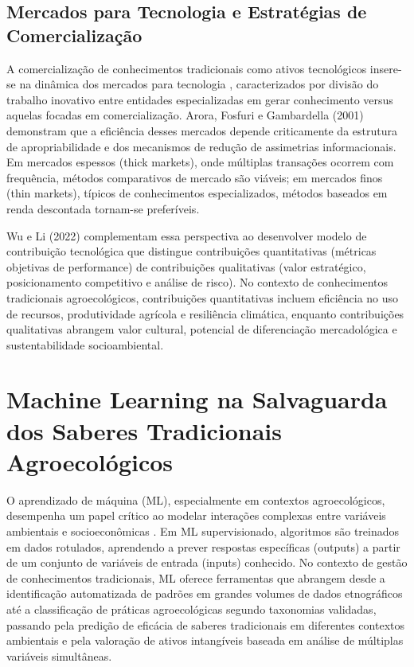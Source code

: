 \subsection{Mercados para Tecnologia e Estratégias de Comercialização}

A comercialização de conhecimentos tradicionais como ativos tecnológicos insere-se na dinâmica dos mercados para tecnologia \cite{AroraEtAl2001}, caracterizados por divisão do trabalho inovativo entre entidades especializadas em gerar conhecimento versus aquelas focadas em comercialização. Arora, Fosfuri e Gambardella (2001) demonstram que a eficiência desses mercados depende criticamente da estrutura de apropriabilidade e dos mecanismos de redução de assimetrias informacionais. Em mercados espessos (thick markets), onde múltiplas transações ocorrem com frequência, métodos comparativos de mercado são viáveis; em mercados finos (thin markets), típicos de conhecimentos especializados, métodos baseados em renda descontada tornam-se preferíveis.

Wu e Li (2022) complementam essa perspectiva ao desenvolver modelo de contribuição tecnológica que distingue contribuições quantitativas (métricas objetivas de performance) de contribuições qualitativas (valor estratégico, posicionamento competitivo e análise de risco). No contexto de conhecimentos tradicionais agroecológicos, contribuições quantitativas incluem eficiência no uso de recursos, produtividade agrícola e resiliência climática, enquanto contribuições qualitativas abrangem valor cultural, potencial de diferenciação mercadológica e sustentabilidade socioambiental.

\section{Machine Learning na Salvaguarda dos Saberes Tradicionais Agroecológicos}

O aprendizado de máquina (ML), especialmente em contextos agroecológicos, desempenha um papel crítico ao modelar interações complexas entre variáveis ambientais e socioeconômicas \cite{Zhou2018}. Em ML supervisionado, algoritmos são treinados em dados rotulados, aprendendo a prever respostas específicas (outputs) a partir de um conjunto de variáveis de entrada (inputs) conhecido. No contexto de gestão de conhecimentos tradicionais, ML oferece ferramentas que abrangem desde a identificação automatizada de padrões em grandes volumes de dados etnográficos até a classificação de práticas agroecológicas segundo taxonomias validadas, passando pela predição de eficácia de saberes tradicionais em diferentes contextos ambientais e pela valoração de ativos intangíveis baseada em análise de múltiplas variáveis simultâneas. 

